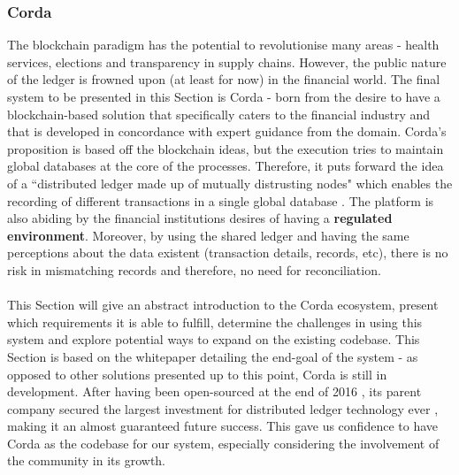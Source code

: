 \documentclass[12pt,twoside]{article}
\begin{document}
\subsubsection{Corda}
\label{sub:Corda}
The blockchain paradigm has the potential to revolutionise many areas - health services, elections and transparency in supply chains. However, the public nature of the ledger is frowned upon (at least for now) in the financial world. The final system to be presented in this Section is Corda - born from the desire to have a blockchain-based solution that specifically caters to the financial industry and that is developed in concordance with expert guidance from the domain. Corda's proposition is based off the blockchain ideas, but the execution tries to maintain global databases at the core of the processes. Therefore, it puts forward the idea of a ``distributed ledger made up of mutually distrusting nodes" which enables the recording of different transactions in a single global database \cite{Corda:IP}. The platform is also abiding by the financial institutions desires of having a \textbf{regulated environment}. Moreover, by using the shared ledger and having the same perceptions about the data existent (transaction details, records, etc), there is no risk in mismatching records and therefore, no need for reconciliation.
\\ \\
This Section will give an abstract introduction to the Corda ecosystem, present which requirements it is able to fulfill, determine the challenges in using this system and explore potential ways to expand on the existing codebase. This Section is based on the whitepaper detailing the end-goal of the system - as opposed to other solutions presented up to this point, Corda is still in development. After having been open-sourced at the end of 2016 \cite{cordaops}, its parent company secured the largest investment for distributed ledger technology ever \cite{cordainv}, making it an almost guaranteed future success. This gave us confidence to have Corda as the codebase for our system, especially considering the involvement of the community in its growth.
\\ \\
\end{document}
